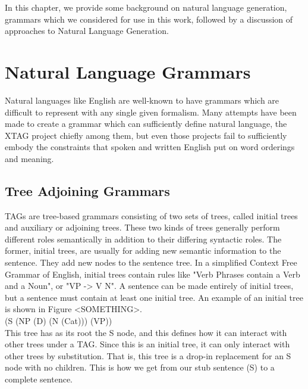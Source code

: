 In this chapter, we provide some background on natural language generation,
grammars which we considered for use in this work, followed by a discussion
of approaches to Natural Language Generation.

\section{Natural Language Grammars}

Natural languages like English are well-known to have grammars which are difficult
to represent with any single given formalism.  Many attempts have been made to
create a grammar which can sufficiently define natural language, the XTAG project
chiefly among them, but even those projects fail to sufficiently embody the
constraints that spoken and written English put on word orderings and meaning.

\subsection{Tree Adjoining Grammars}

TAGs are tree-based grammars consisting of two sets of trees, called initial
trees and auxiliary or adjoining trees.  These two kinds of trees generally perform
different roles semantically in addition to their differing syntactic roles.  The former,
initial trees, are usually for adding new semantic information to the sentence.  They
add new nodes to the sentence tree.  In a simplified Context Free Grammar of English,
initial trees contain rules like "Verb Phrases contain a Verb and a Noun", or "VP -> V N".
A sentence can be made entirely of initial trees, but a sentence must contain at least
one initial tree.  An example of an initial tree is shown in Figure <SOMETHING>.\\
(S (NP (D) (N (Cat))) (VP))\\
This tree has as its root the S node, and this defines how it can interact with other
trees under a TAG.  Since this is an initial tree, it can only interact with other trees by
substitution.  That is, this tree is a drop-in replacement for an S node with no children.
This is how we get from our stub sentence (S) to a complete sentence.

